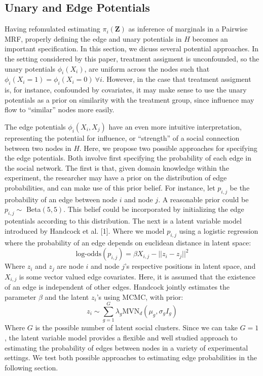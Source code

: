 \documentclass{article}
\begin{document}
\subsection{Unary and Edge Potentials}

Having refomulated estimating $\pi_i(\mathbf{Z})$ as inference of marginals in a Pairwise MRF, 
properly defining the edge and unary potentials in $H$ becomes an important specification. In this section, 
we dicuss several potential approaches. In the setting considered by this paper, treatment assigment is unconfounded, so 
the unary potentials $\phi_i(X_i)$, are uniform across the nodes such that $\phi_i(X_i = 1) = \phi_i(X_i = 0) \ \forall i$. However, 
in the case that treatment assigment is, for instance, confounded by covariates, it may make sense to use the unary potentials as a prior on similarity 
with the treatment group, since influence may flow to ``similar'' nodes more easily. 

The edge potentials $\phi_i(X_i, X_j)$ have an even more intuitive interpretation, representing the potential for influence, or ``strength'' of a social connection between two nodes in $H$. Here, 
we propose two possible approaches for specifying the edge potentials. Both involve first specifying the probability of each edge in the social network. The first is that, given domain knowledge within the experiment, the researcher may have a prior on the distribution of 
edge probabilities, and can make use of this prior belief. For instance, let $p_{i,j}$ be the probability of an edge between node 
$i$ and node $j$. A reasonable prior could be $p_{i,j} \sim $ Beta$(5, 5)$. This belief could be incorporated by initializing the 
edge potentials according to this distribution. The next is a latent variable model introduced by Handcock et al. \label{1}[1]. Where we model $p_{i,j}$ using a logistic regression where the probability of an edge depends on euclidean distance in latent space: 
\begin{equation}
  \mbox{log-odds}(p_{i,j}) = \beta X_{i,j} - ||z_i - z_j||^2
\end{equation}
Where $z_i$ and $z_j$ are node $i$ and node $j$'s respective positions in latent space, and $X_{i,j}$ is some vector valued edge covariates. Here, it is assumed that the existence of an edge is independent of other edges. 
Handcock jointly estimates the parameter $\beta$ and the latent $z_i$'s using MCMC, with prior: \begin{displaymath}
  z_i \sim \sum_{g = 1}^{G}\lambda_g \mbox{MVN}_d(\mu_g, \sigma_gI_g) 
\end{displaymath}
Where $G$ is the possible number of latent social clusters. Since we can take $G = 1$, the latent variable model provides a flexible and well 
studied approach to estimating the probability of edges between nodes in a variety of experimental settings. We test both possible approaches to estimating 
edge probabilities in the following section.
\end{document}
